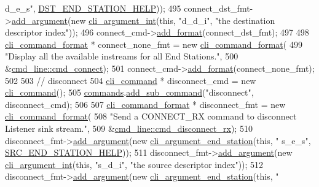 \begin{DoxyCode}
{      d\_e\_s"}, \hyperlink{cmd__line_8cpp_a98040c43d21908ec69faa420184085bd}{DST\_END\_STATION\_HELP}));
495     connect\_dst\_fmt->\hyperlink{classcli__command__format_ac3fc6d13a227c195d5ee6f7b78eba9cd}{add\_argument}(\textcolor{keyword}{new} \hyperlink{classcli__argument__int}{cli\_argument\_int}(\textcolor{keyword}{this}, \textcolor{stringliteral}{"d\_d\_i"}, \textcolor{stringliteral}{"the
       destination descriptor index"}));
496     connect\_cmd->\hyperlink{classcli__command_aa9ec38e761644d946f8db2b920e39921}{add\_format}(connect\_dst\_fmt);
497 
498     \hyperlink{classcli__command__format}{cli\_command\_format} * connect\_none\_fmt = \textcolor{keyword}{new} 
      \hyperlink{classcli__command__format}{cli\_command\_format}(
499         \textcolor{stringliteral}{"Display all the available instreams for all End Stations."},
500         &\hyperlink{classcmd__line_a3378afaff29dbd27e191a20fad8ab9cd}{cmd\_line::cmd\_connect});
501     connect\_cmd->\hyperlink{classcli__command_aa9ec38e761644d946f8db2b920e39921}{add\_format}(connect\_none\_fmt);
502 
503     \textcolor{comment}{// disconnect}
504     \hyperlink{classcli__command}{cli\_command} * disconnect\_cmd = \textcolor{keyword}{new} \hyperlink{classcli__command}{cli\_command}();
505     \hyperlink{classcmd__line_ae4fea670c2fdd2b60f7b5b6ad6fbaf1e}{commands}.\hyperlink{classcli__command_aa73a67e8ebb6facd4b40ced66279b226}{add\_sub\_command}(\textcolor{stringliteral}{"disconnect"}, disconnect\_cmd);
506 
507     \hyperlink{classcli__command__format}{cli\_command\_format} * disconnect\_fmt = \textcolor{keyword}{new} 
      \hyperlink{classcli__command__format}{cli\_command\_format}(
508         \textcolor{stringliteral}{"Send a CONNECT\_RX command to disconnect Listener sink stream."},
509         &\hyperlink{classcmd__line_a5cdfb276705d76d2f6046c4e5cdf56f4}{cmd\_line::cmd\_disconnect\_rx});
510     disconnect\_fmt->\hyperlink{classcli__command__format_ac3fc6d13a227c195d5ee6f7b78eba9cd}{add\_argument}(\textcolor{keyword}{new} \hyperlink{classcli__argument__end__station}{cli\_argument\_end\_station}(\textcolor{keyword}{this}, \textcolor{stringliteral}{"
      s\_e\_s"}, \hyperlink{cmd__line_8cpp_a74df33715dde99b760d515a90f164e1e}{SRC\_END\_STATION\_HELP}));
511     disconnect\_fmt->\hyperlink{classcli__command__format_ac3fc6d13a227c195d5ee6f7b78eba9cd}{add\_argument}(\textcolor{keyword}{new} \hyperlink{classcli__argument__int}{cli\_argument\_int}(\textcolor{keyword}{this}, \textcolor{stringliteral}{"s\_d\_i"}, \textcolor{stringliteral}{"the
       source descriptor index"}));
512     disconnect\_fmt->\hyperlink{classcli__command__format_ac3fc6d13a227c195d5ee6f7b78eba9cd}{add\_argument}(\textcolor{keyword}{new} \hyperlink{classcli__argument__end__station}{cli\_argument\_end\_station}(\textcolor{keyword}{this}, \textcolor{stringliteral}{"
}
\end{DoxyCode}
